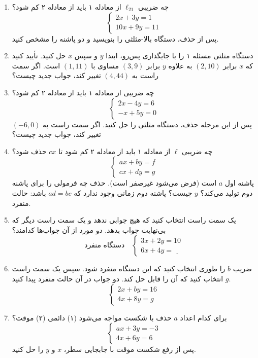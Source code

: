 \documentclass[12pt, a4paper]{book}
\theoremstyle{translator}
\begin{document}
	\begin{enumerate}
		\item چه ضریبی $\ell_{21}$ از معادله ۱ باید از معادله ۲ کم شود؟
		\[
		\begin{cases}
			2x + 3y = 1 \\
			10x + 9y = 11
		\end{cases}
		\]
		پس از حذف، دستگاه بالا-مثلثی را بنویسید و دو پاشنه را مشخص کنید.
		
		\item دستگاه مثلثی مسئله ۱ را با جایگذاری پس‌رو، ابتدا $y$ و سپس $x$ حل کنید. تأیید کنید که $x$ برابر $(2, 10)$ به علاوه $y$ برابر $(3, 9)$ مساوی با $(1, 11)$ است. اگر سمت راست به $(4, 44)$ تغییر کند، جواب جدید چیست؟
		
		\item چه ضریبی از معادله ۱ باید از معادله ۲ کم شود؟
		\[
		\begin{cases}
			2x - 4y = 6 \\
			-x + 5y = 0
		\end{cases}
		\]
		پس از این مرحله حذف، دستگاه مثلثی را حل کنید. اگر سمت راست به $(-6, 0)$ تغییر کند، جواب جدید چیست؟
		
		\item چه ضریبی $\ell$ از معادله ۱ باید از معادله ۲ کم شود تا $cx$ حذف شود؟
		\[
		\begin{cases}
			ax+by=f \\
			cx+dy=g
		\end{cases}
		\]
		پاشنه اول $a$ است (فرض می‌شود غیرصفر است). حذف چه فرمولی را برای پاشنه دوم تولید می‌کند؟ $y$ چیست؟ پاشنه دوم زمانی وجود ندارد که $ad=bc$ باشد: حالت منفرد.
		
		\item یک سمت راست انتخاب کنید که هیچ جوابی ندهد و یک سمت راست دیگر که بی‌نهایت جواب بدهد. دو مورد از آن جواب‌ها کدامند؟
		\[
		\text{دستگاه منفرد} \quad
		\begin{cases}
			3x + 2y = 10 \\
			6x + 4y = \underline{\phantom{00}}
		\end{cases}
		\]
		
		\item ضریب $b$ را طوری انتخاب کنید که این دستگاه منفرد شود. سپس یک سمت راست $g$ انتخاب کنید که آن را قابل حل کند. دو جواب در آن حالت منفرد پیدا کنید.
		\[
		\begin{cases}
			2x + by = 16 \\
			4x + 8y = g
		\end{cases}
		\]
		
		\item برای کدام اعداد $a$ حذف با شکست مواجه می‌شود (۱) دائمی (۲) موقت؟
		\[
		\begin{cases}
			ax + 3y = -3 \\
			4x + 6y = 6
		\end{cases}
		\]
		پس از رفع شکست موقت با جابجایی سطر، $x$ و $y$ را حل کنید.
		

\end{enumerate}
\end{document}
